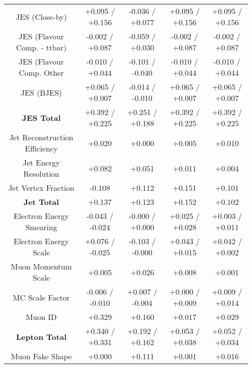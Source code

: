 \begin{table}[htbp]
\begin{center}
\begin{tabular}{|c|c|c|c|c|}
JES (Close-by)                        &+0.095   / +0.156   & -0.036   / +0.077   & +0.095   / +0.156   & +0.095   / +0.156  \\
JES (Flavour Comp. - ttbar)           &-0.002   / +0.087   & -0.059   / +0.030   & -0.002   / +0.087   & -0.002   / +0.087  \\
JES (Flavour Comp. Other              &-0.010   / +0.044   & -0.101   / -0.040   & -0.010   / +0.044   & -0.010   / +0.044  \\
JES (BJES)                            &+0.065   / +0.007   & -0.014   / -0.010   & +0.065   / +0.007   & +0.065   / +0.007  \\
\hline
\textbf{JES Total}                    &+0.392   / +0.225   & +0.251   / +0.188   & +0.392   / +0.225   & +0.392   / +0.225  \\
\hline
Jet Reconstruction Efficiency         &+0.020              & +0.000              & +0.005              & +0.010             \\
Jet Energy Resolution                 &+0.082              & +0.051              & +0.011              & +0.004             \\
Jet Vertex Fraction                   &-0.108              & +0.112              & +0.151              & +0.101             \\
\hline
\textbf{Jet Total}                    &+0.137              & +0.123              & +0.152              & +0.102             \\
\hline
Electron Energy Smearing              &-0.043   / -0.024   & -0.000   / +0.000   & +0.025   / +0.028   & +0.003   / +0.011  \\
Electron Energy Scale                 &+0.076   / -0.025   & -0.103   / -0.000   & +0.043   / +0.015   & +0.042   / +0.002  \\
Muon Momentum Scale                   &+0.005              & +0.026              & +0.008              & +0.001             \\
MC Scale Factor                       &-0.006   / -0.010   & +0.007   / -0.004   & +0.000   / +0.009   & +0.009   / +0.014  \\
Muon ID                               &+0.329              & +0.160              & +0.017              & +0.029             \\
\hline
\textbf{Lepton Total}                 &+0.340   / +0.331   & +0.192   / +0.162   & +0.053   / +0.038   & +0.052   / +0.034  \\
\hline
Muon Fake Shape                       &+0.000              & +0.111              & +0.001              & +0.016             \\

\end{tabular}
\end{center}
\end{table}
